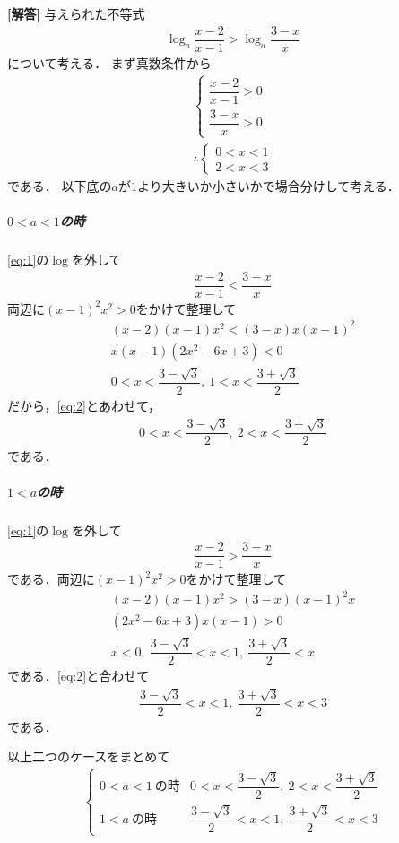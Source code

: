 \documentclass[../../main.tex]{subfiles}
\begin{document}
\begin{oframed}
  
\end{oframed}

{\bf [解答]}
与えられた不等式
\begin{align}
  \log_{a}\dfrac{x-2}{x-1} > \log_{a}\dfrac{3-x}{x} \label{eq:1}
\end{align}
について考える．
まず真数条件から
\begin{align}
  \begin{cases}
    \dfrac{x-2}{x-1}>0 \\
    \dfrac{3-x}{x} > 0
  \end{cases} \\
  \therefore
  \begin{cases}
    0<x<1 \\
    2<x<3
  \end{cases} \label{eq:2}
\end{align}
である．
以下底の$a$が$1$より大きいか小さいかで場合分けして考える．

\subparagraph{$0<a<1$の時}

\cref{eq:1}の$\log$を外して
\begin{align}
  \dfrac{x-2}{x-1}<\dfrac{3-x}{x}
\end{align}
両辺に$(x-1)^2x^2>0$をかけて整理して
\begin{align}
  (x-2)(x-1)x^2<(3-x)x(x-1)^2 \\
  x(x-1)(2x^2-6x+3)<0 \\
  0<x<\dfrac{3-\sqrt{3}}{2},\ 1<x<\dfrac{3+\sqrt{3}}{2}
\end{align}
だから，\cref{eq:2}とあわせて，
\begin{align}
  0<x<\dfrac{3-\sqrt{3}}{2},\ 2<x<\dfrac{3+\sqrt{3}}{2}
\end{align}
である．

\subparagraph{$1<a$の時}

\cref{eq:1}の$\log$を外して
\begin{align}
  \dfrac{x-2}{x-1}>\dfrac{3-x}{x}
\end{align}
である．両辺に$(x-1)^2x^2>0$をかけて整理して
\begin{align}
  (x-2)(x-1)x^2 > (3-x)(x-1)^2x \\
  (2x^2-6x+3)x(x-1) > 0 \\
  x<0,\ \dfrac{3-\sqrt{3}}{2}<x<1,\ \dfrac{3+\sqrt{3}}{2}<x
\end{align}
である．\cref{eq:2}と合わせて
\begin{align}
  \dfrac{3-\sqrt{3}}{2}<x<1,\ \dfrac{3+\sqrt{3}}{2}<x<3
\end{align}
である．
\casesend

以上二つのケースをまとめて
\begin{align}
  \begin{cases}
    0<a<1\ \text{の時} & 0<x<\dfrac{3-\sqrt{3}}{2},\ 2<x<\dfrac{3+\sqrt{3}}{2} \\
    1<a\ \text{の時}   & \dfrac{3-\sqrt{3}}{2}<x<1,\ \dfrac{3+\sqrt{3}}{2}<x<3
  \end{cases}
\end{align}

\newpage
\end{document}
